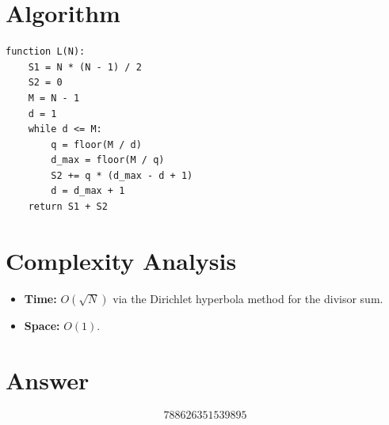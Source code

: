 \documentclass[11pt]{article}
\begin{document}
\section{Algorithm}

\begin{verbatim}
function L(N):
    S1 = N * (N - 1) / 2
    S2 = 0
    M = N - 1
    d = 1
    while d <= M:
        q = floor(M / d)
        d_max = floor(M / q)
        S2 += q * (d_max - d + 1)
        d = d_max + 1
    return S1 + S2
\end{verbatim}

\section{Complexity Analysis}

\begin{itemize}
    \item \textbf{Time:} $O(\sqrt{N})$ via the Dirichlet hyperbola method for the divisor sum.
    \item \textbf{Space:} $O(1)$.
\end{itemize}

\section{Answer}

\[
\boxed{788626351539895}
\]
\end{document}
